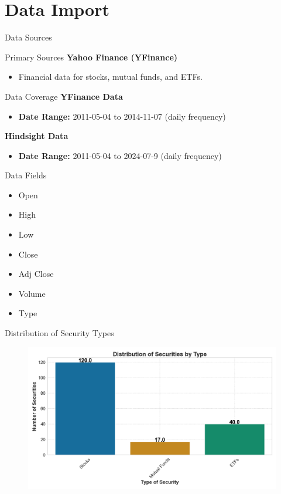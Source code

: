\documentclass{beamer}
\begin{document}
\section{Data Import}
\begin{frame}{Data Sources}
    \begin{block}{Primary Sources}
        \textbf{Yahoo Finance (YFinance)}
        \begin{itemize}
            \item Financial data for stocks, mutual funds, and ETFs.
        \end{itemize}
    \end{block}
    \begin{block}{Data Coverage}
        \textbf{YFinance Data}
        \begin{itemize}
            \item \textbf{Date Range:} 2011-05-04 to 2014-11-07 (daily frequency)
        \end{itemize}
        \textbf{Hindsight Data}
        \begin{itemize}
            \item \textbf{Date Range:} 2011-05-04 to 2024-07-9 (daily frequency)
        \end{itemize}
    \end{block}
    \begin{block}{Data Fields}
        \begin{multicols}{2}
        \begin{itemize}
            \item Open
            \item High
            \item Low
            \item Close
            \item Adj Close
            \item Volume
            \item Type
        \end{itemize}
        \end{multicols}
    \end{block}
\end{frame}

\begin{frame}{Distribution of Security Types}
    \begin{figure}
        \centering
        \includegraphics[width=\linewidth]{../Figures/histogram_security_count.png}
    \end{figure}
\end{frame}
\end{document}
